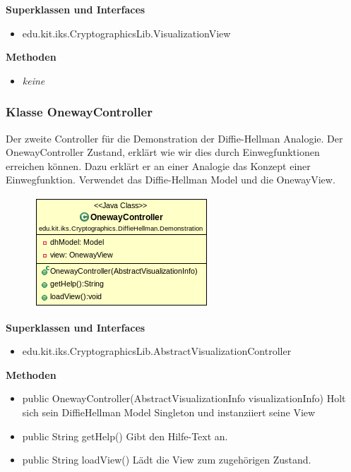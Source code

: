 \documentclass{article}
\begin{document}
      \textbf{Superklassen und Interfaces}
      \begin{itemize}
        \item edu.kit.iks.CryptographicsLib.VisualizationView
      \end{itemize}

      \textbf{Methoden}
      \begin{itemize}
        \item \textit{keine}
      \end{itemize}

\subsubsection{Klasse OnewayController}
      Der zweite Controller für die Demonstration der Diffie-Hellman Analogie.
      Der OnewayController Zustand, erklärt wie wir dies durch Einwegfunktionen
      erreichen können. Dazu erklärt er an einer Analogie das Konzept
      einer Einwegfunktion.
      Verwendet das Diffie-Hellman Model und die OnewayView.

      \begin{figure}[H]
        \centering
        \includegraphics{resources/edu-kit-iks-Cryptographics-DiffieHellman-Demonstration-OnewayController}
      \end{figure}

      \textbf{Superklassen und Interfaces}
      \begin{itemize}
        \item edu.kit.iks.CryptographicsLib.AbstractVisualizationController
      \end{itemize}

      \textbf{Methoden}
      \begin{itemize}
          \item public OnewayController(AbstractVisualizationInfo visualizationInfo) \newline
              Holt sich sein DiffieHellman Model Singleton und instanziiert seine View
        \item public String getHelp() \newline
        Gibt den Hilfe-Text an.
        \item public String loadView() \newline
        Lädt die View zum zugehörigen Zustand.
      \end{itemize}
\end{document}
